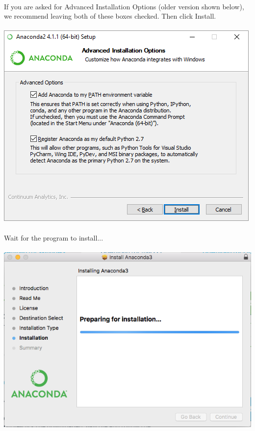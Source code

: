 \documentclass[]{article}
\begin{document}
\paragraph{}

\paragraph{}
If you are asked for Advanced Installation Options (older version shown below), we recommend leaving both of these boxes checked. Then click Install.
\paragraph{}
\begin{centering}
    \centerline{\includegraphics[scale=0.5]{Screenshot_9.png}}
\end{centering}

\clearpage
\paragraph{}
Wait for the program to install...
\paragraph{}
\begin{centering}
    \centerline{\includegraphics[scale=0.5]{Screenshot_10.png}}
\end{centering}
\end{document}
